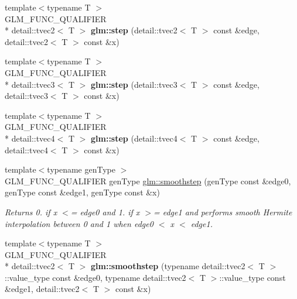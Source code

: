 \begin{DoxyCompactItemize}
\item 
\hypertarget{namespaceglm_ada537586e2c341cbdd3e4a213b03a2da}{{\footnotesize template$<$typename T $>$ }\\G\-L\-M\-\_\-\-F\-U\-N\-C\-\_\-\-Q\-U\-A\-L\-I\-F\-I\-E\-R \\*
detail\-::tvec2$<$ T $>$ {\bfseries glm\-::step} (detail\-::tvec2$<$ T $>$ const \&edge, detail\-::tvec2$<$ T $>$ const \&x)}\label{namespaceglm_ada537586e2c341cbdd3e4a213b03a2da}

\item 
\hypertarget{namespaceglm_afc1e0844aecc410c1ab7204423ea81f3}{{\footnotesize template$<$typename T $>$ }\\G\-L\-M\-\_\-\-F\-U\-N\-C\-\_\-\-Q\-U\-A\-L\-I\-F\-I\-E\-R \\*
detail\-::tvec3$<$ T $>$ {\bfseries glm\-::step} (detail\-::tvec3$<$ T $>$ const \&edge, detail\-::tvec3$<$ T $>$ const \&x)}\label{namespaceglm_afc1e0844aecc410c1ab7204423ea81f3}

\item 
\hypertarget{namespaceglm_a473ace2b49062e6f5a5203697a7d369d}{{\footnotesize template$<$typename T $>$ }\\G\-L\-M\-\_\-\-F\-U\-N\-C\-\_\-\-Q\-U\-A\-L\-I\-F\-I\-E\-R \\*
detail\-::tvec4$<$ T $>$ {\bfseries glm\-::step} (detail\-::tvec4$<$ T $>$ const \&edge, detail\-::tvec4$<$ T $>$ const \&x)}\label{namespaceglm_a473ace2b49062e6f5a5203697a7d369d}

\item 
{\footnotesize template$<$typename gen\-Type $>$ }\\G\-L\-M\-\_\-\-F\-U\-N\-C\-\_\-\-Q\-U\-A\-L\-I\-F\-I\-E\-R gen\-Type \hyperlink{group__core__func__common_gabdfe71a62ef69b5ec834601e87588667}{glm\-::smoothstep} (gen\-Type const \&edge0, gen\-Type const \&edge1, gen\-Type const \&x)
\begin{DoxyCompactList}\small\item\em Returns 0. if x $<$= edge0 and 1. if x $>$= edge1 and performs smooth Hermite interpolation between 0 and 1 when edge0 $<$ x $<$ edge1. \end{DoxyCompactList}\item 
\hypertarget{namespaceglm_a014f47bc1de6cd13bf15da2f52ca298b}{{\footnotesize template$<$typename T $>$ }\\G\-L\-M\-\_\-\-F\-U\-N\-C\-\_\-\-Q\-U\-A\-L\-I\-F\-I\-E\-R \\*
detail\-::tvec2$<$ T $>$ {\bfseries glm\-::smoothstep} (typename detail\-::tvec2$<$ T $>$\-::value\-\_\-type const \&edge0, typename detail\-::tvec2$<$ T $>$\-::value\-\_\-type const \&edge1, detail\-::tvec2$<$ T $>$ const \&x)}\label{namespaceglm_a014f47bc1de6cd13bf15da2f52ca298b}


\end{DoxyCompactItemize}
